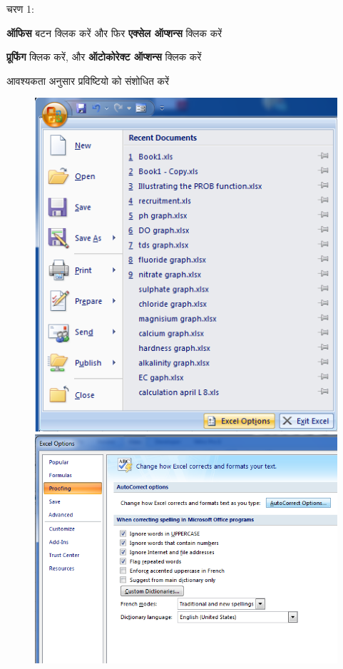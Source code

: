 \begin{descriptionSimple}{चरण 1:}
\item[चरण 1] \textbf{ऑफिस} बटन क्लिक करें और फिर \textbf{एक्सेल ऑप्शन्स} क्लिक करें
\item[चरण 2] \textbf{प्रूफिंग} क्लिक करें, और \textbf{ऑटोकोरेक्ट ऑप्शन्स} क्लिक करें
\item[चरण 3] आवश्यकता अनुसार प्रविष्टियो को संशोधित करें
\end{descriptionSimple}
\begin{figure}[H]
\centering
\includegraphics[scale=0.3]{src/images/chapter1/chapter1_fig65.png}\qquad
\includegraphics[scale=0.3]{src/images/chapter1/chapter1_fig66.png}
\end{figure}
